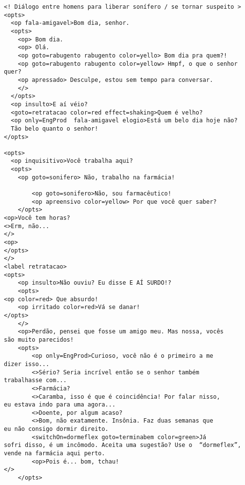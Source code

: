 {\footnotesize
\begin{verbatim}
<! Diálogo entre homens para liberar sonífero / se tornar suspeito >
<opts>
  <op fala-amigavel>Bom dia, senhor.
  <opts>
    <op> Bom dia.
    <op> Olá.
    <op goto=rabugento rabugento color=yello> Bom dia pra quem?!
    <op goto=rabugento rabugento color=yellow> Hmpf, o que o senhor quer?
    <op apressado> Desculpe, estou sem tempo para conversar.
    </>
  </opts>
  <op insulto>E aí véio?
  <goto=retratacao color=red effect=shaking>Quem é velho?
  <op only=EngProd  fala-amigavel elogio>Está um belo dia hoje não?
  Tão belo quanto o senhor!
</opts>

<opts>
  <op inquisitivo>Você trabalha aqui?
  <opts>
    <op goto=sonifero> Não, trabalho na farmácia!
		
		<op goto=sonifero>Não, sou farmacêutico!
		<op apreensivo color=yellow> Por que você quer saber?
	</opts>
<op>Você tem horas?
<>Erm, não...
</>
<op>
</opts>
</>
<label retratacao>
<opts>
	<op insulto>Não ouviu? Eu disse E AÍ SURDO!?
	<opts>
<op color=red> Que absurdo!
	<op irritado color=red>Vá se danar!
</opts>
	</>
	<op>Perdão, pensei que fosse um amigo meu. Mas nossa, vocês
são muito parecidos!
	<opts>
		<op only=EngProd>Curioso, você não é o primeiro a me
dizer isso...
		<>Sério? Seria incrível então se o senhor também
trabalhasse com...
		<>Farmácia?
		<>Caramba, isso é que é coincidência! Por falar nisso,
eu estava indo para uma agora...
		<>Doente, por algum acaso?
		<>Bom, não exatamente. Insônia. Faz duas semanas que
eu não consigo dormir direito.
		<switchOn=dormeflex goto=terminabem color=green>Já
sofri disso, é um incômodo. Aceita uma sugestão? Use o  “dormeflex”,
vende na farmácia aqui perto.
		<op>Pois é... bom, tchau!
</>
	</opts>


\end{verbatim}}
